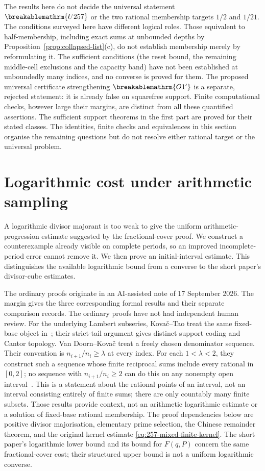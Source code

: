 \documentclass[11pt]{article}
\theoremstyle{plain}
\theoremstyle{definition}
\theoremstyle{remark}
\renewcommand{\mathrm}[1]{\ifmmode\breakablemathrm{#1}\else\textrm{#1}\fi}%
\begin{document}
The results here do not decide the universal statement
$\mathrm{U257}$ or the two rational membership targets $1/2$ and
$1/21$.  The conditions surveyed here have different logical roles.
Those equivalent to half-membership, including exact sums at unbounded
depths by Proposition~\ref{prop:collapsed-list}(c), do not establish
membership merely by reformulating it.  The sufficient conditions (the
reset bound, the remaining middle-cell exclusions and the capacity band)
have not been established at unboundedly many indices, and
no converse is proved for them.  The proposed universal certificate
strengthening $\mathrm{O1'}$ is a separate, rejected statement: it is
already false on squarefree support.  Finite computational checks,
however large their margins, are distinct from all these quantified
assertions. The sufficient support theorems in the first part are proved for their
stated classes.  The identities, finite checks and equivalences in this
section organise the remaining questions but do not resolve either
rational target or the universal problem.

\clearpage
\section{Logarithmic cost under arithmetic sampling}\label{sec:257-logarithmic-sampling}
A logarithmic divisor majorant is too weak to give the uniform
arithmetic-progression estimate suggested by the fractional-cover proof.
We construct a counterexample already visible on complete periods, so
an improved incomplete-period error cannot remove it. We then prove an
initial-interval estimate. This distinguishes the available logarithmic
bound from a converse to the short paper's divisor-cube estimates.

The ordinary proofs originate in an AI-assisted note of 17 September
2026. The margin gives the three corresponding formal results and
their separate comparison records. The ordinary proofs have not had
independent human review.
For the underlying Lambert subseries, Kova\v{c}--Tao treat the same fixed-base
object in~\cite[Section~2.1.2 and Remark~4.1]{kovactao}; their strict-tail
argument gives distinct support coding and Cantor topology.
Van Doorn--Kova\v{c} treat a freely chosen denominator sequence.
Their convention is $n_{i+1}/n_i\ge\lambda$ at every index.
For each $1<\lambda<2$, they construct such a sequence whose finite
reciprocal sums include every rational in $[0,2]$; no sequence with
$n_{i+1}/n_i\ge2$ can do this on any nonempty open
interval~\cite[Theorem~1, Lemma~4 and Corollary~5]{vandoornkovac}.
This is a statement about the rational points of an interval,
not an interval consisting entirely of finite sums; there are
only countably many finite subsets.
Those results provide context, not an arithmetic logarithmic estimate or a
solution of fixed-base rational membership.  The proof dependencies below
are positive divisor majorisation, elementary prime selection, the Chinese
remainder theorem, and the original kernel estimate
\eqref{eq:257-mixed-finite-kernel}.  The short paper's logarithmic lower bound
and its bound for $F(q,P)$ concern the same fractional-cover cost; their
structured upper bound is not a uniform logarithmic converse.
\end{document}
